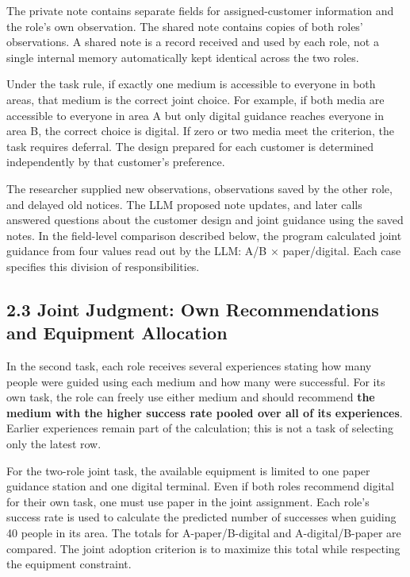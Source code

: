 \documentclass[10pt,a4paper]{article}
\begin{document}
The private note contains separate fields for assigned-customer information and the role's own observation. The shared note contains copies of both roles' observations. A shared note is a record received and used by each role, not a single internal memory automatically kept identical across the two roles.

Under the task rule, if exactly one medium is accessible to everyone in both areas, that medium is the correct joint choice. For example, if both media are accessible to everyone in area A but only digital guidance reaches everyone in area B, the correct choice is digital. If zero or two media meet the criterion, the task requires deferral. The design prepared for each customer is determined independently by that customer's preference.

The researcher supplied new observations, observations saved by the other role, and delayed old notices. The LLM proposed note updates, and later calls answered questions about the customer design and joint guidance using the saved notes. In the field-level comparison described below, the program calculated joint guidance from four values read out by the LLM: A/B × paper/digital. Each case specifies this division of responsibilities.

\subsection{2.3 Joint Judgment: Own Recommendations and Equipment Allocation}\label{two-role-failure-design-joint-judgment-own-recommendations-and-equipment-allocation}

In the second task, each role receives several experiences stating how many people were guided using each medium and how many were successful. For its own task, the role can freely use either medium and should recommend \textbf{the medium with the higher success rate pooled over all of its experiences}. Earlier experiences remain part of the calculation; this is not a task of selecting only the latest row.

For the two-role joint task, the available equipment is limited to one paper guidance station and one digital terminal. Even if both roles recommend digital for their own task, one must use paper in the joint assignment. Each role's success rate is used to calculate the predicted number of successes when guiding 40 people in its area. The totals for A-paper/B-digital and A-digital/B-paper are compared. The joint adoption criterion is to maximize this total while respecting the equipment constraint.
\end{document}
